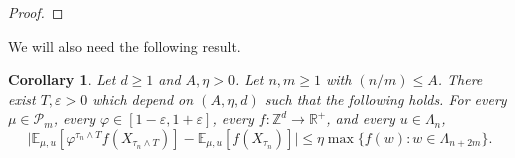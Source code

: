 \documentclass[11pt,a4paper]{article}
\numberwithin{equation}{section}
\theoremstyle{plain}
\newtheorem{Cor}[Thm]{Corollary}
\theoremstyle{definition}
\begin{document}
\begin{proof}
\end{proof}

We will also need the following result.
\begin{Cor}\label{cor: estimate srw} Let $d\geq 1$ and $A,\eta>0$. Let $n,m\geq 1$ with $(n/m)\leq A$. There exist $T,\varepsilon>0$ which depend on $(A, \eta,d)$ such that the following holds. For every $\mu \in \mathcal P_m$, every $\varphi\in [1-\varepsilon,1+\varepsilon]$, every $f:\mathbb Z^d\rightarrow \mathbb R^+$, and every $u \in \Lambda_n$,
\begin{equation}
	\Big|\mathbb E_{\mu,u}[\varphi^{\tau_n\wedge T}f(X_{\tau_n\wedge T})]-\mathbb E_{\mu,u}[f(X_{\tau_n})]\Big|\leq \eta \max\{f(w):w\in \Lambda_{n+2m}\}.
\end{equation}
\end{Cor}
\end{document}
